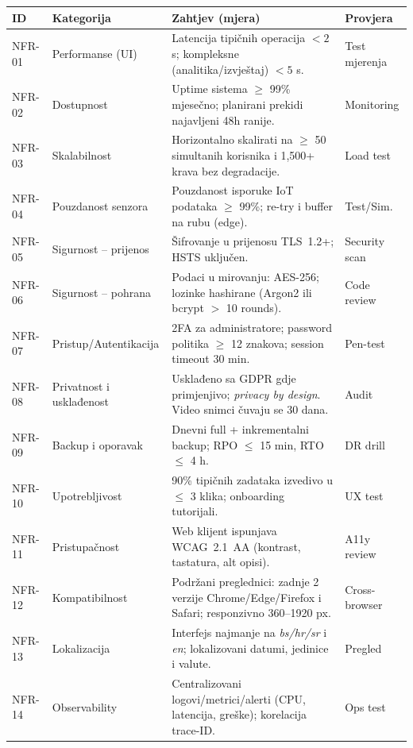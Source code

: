 \documentclass{article}
\begin{document}
\begin{longtable}{|L{1.8cm}|L{3.5cm}|L{8.8cm}|L{2.6cm}|}
\hline
{}\textbf{ID} & \textbf{Kategorija} & \textbf{Zahtjev (mjera)} & \textbf{Provjera} \\
\hline
NFR-01 & Performanse (UI) & Latencija tipičnih operacija $<2$ s; kompleksne (analitika/izvještaj) $<5$ s. & Test mjerenja \\
\hline
NFR-02 & Dostupnost & Uptime sistema $\geq$ 99\% mjesečno; planirani prekidi najavljeni 48h ranije. & Monitoring \\
\hline
NFR-03 & Skalabilnost & Horizontalno skalirati na $\geq$ 50 simultanih korisnika i 1{,}500+ krava bez degradacije. & Load test \\
\hline
NFR-04 & Pouzdanost senzora & Pouzdanost isporuke IoT podataka $\geq$ 99\%; re-try i buffer na rubu (edge). & Test/Sim. \\
\hline
NFR-05 & Sigurnost – prijenos & Šifrovanje u prijenosu TLS~1.2+; HSTS uključen. & Security scan \\
\hline
NFR-06 & Sigurnost – pohrana & Podaci u mirovanju: AES-256; lozinke hashirane (Argon2 ili bcrypt $>$ 10 rounds). & Code review \\
\hline
NFR-07 & Pristup/Autentikacija & 2FA za administratore; password politika $\geq$ 12 znakova; session timeout 30 min. & Pen-test \\
\hline
NFR-08 & Privatnost i usklađenost & Usklađeno sa GDPR gdje primjenjivo; \emph{privacy by design}. Video snimci čuvaju se 30 dana. & Audit \\
\hline
NFR-09 & Backup i oporavak & Dnevni full + inkrementalni backup; RPO $\leq$ 15 min, RTO $\leq$ 4 h. & DR drill \\
\hline
NFR-10 & Upotrebljivost & 90\% tipičnih zadataka izvedivo u $\leq$ 3 klika; onboarding tutorijali. & UX test \\
\hline
NFR-11 & Pristupačnost & Web klijent ispunjava WCAG~2.1~AA (kontrast, tastatura, alt opisi). & A11y review \\
\hline
NFR-12 & Kompatibilnost & Podržani preglednici: zadnje 2 verzije Chrome/Edge/Firefox i Safari; responzivno 360–1920 px. & Cross-browser \\
\hline
NFR-13 & Lokalizacija & Interfejs najmanje na \emph{bs/hr/sr} i \emph{en}; lokalizovani datumi, jedinice i valute. & Pregled \\
\hline
NFR-14 & Observability & Centralizovani logovi/metrici/alerti (CPU, latencija, greške); korelacija trace-ID. & Ops test \\

\end{longtable}
\end{document}
